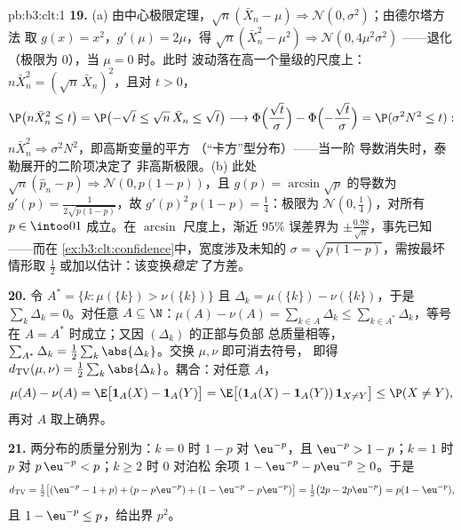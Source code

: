 \begin{solution}{pb:b3:clt:1}
\textbf{19.} (a) 由中心极限定理，$\sqrt n(\bar X_n - \mu)
\Rightarrow \mathcal N(0, \sigma^2)$；由德尔塔方法
取 $g(x) = x^2$，$g'(\mu) = 2\mu$，得 $\sqrt n(\bar
X_n^2 - \mu^2) \Rightarrow \mathcal N(0, 4\mu^2\sigma^2)$
——退化（极限为 $0$），当 $\mu = 0$ 时。此时
波动落在高一个量级的尺度上：$n\bar X_n^2 =
(\sqrt n\,\bar X_n)^2$，且对 $t > 0$，
\[
\P\bigl(n\bar X_n^2 \leq t\bigr) = \P\bigl(-\sqrt t \leq
\sqrt n\,\bar X_n \leq \sqrt t\bigr) \longrightarrow
\Phi\Bigl(\frac{\sqrt t}\sigma\Bigr) -
\Phi\Bigl(-\frac{\sqrt t}\sigma\Bigr) = \P(\sigma^2N^2
\leq t) :
\]
$n\bar X_n^2 \Rightarrow \sigma^2N^2$，即高斯变量的平方
（“卡方”型分布）——当一阶
导数消失时，泰勒展开的二阶项决定了
非高斯极限。(b) 此处 $\sqrt n(\hat p_n - p)
\Rightarrow \mathcal N(0, p(1 - p))$，且 $g(p) =
\arcsin\sqrt p$ 的导数为 $g'(p) = \frac1{2\sqrt{p(1 - p)}}$，故
$g'(p)^2\,p(1 - p) = \frac14$：极限为 $\mathcal
N(0, \frac14)$，对所有 $p \in \intoo01$ 成立。在
$\arcsin$ 尺度上，渐近 $95\%$ 误差界为 $\pm
\frac{0.98}{\sqrt n}$，事先已知——而在
\cref{ex:b3:clt:confidence}中，宽度涉及未知的
$\sigma = \sqrt{p(1-p)}$，需按最坏情形取 $\frac12$
或加以估计：该变换\emph{稳定}
了方差。

\textbf{20.} 令 $A^* = \{k : \mu(\{k\}) > \nu(\{k\})\}$
且 $\Delta_k = \mu(\{k\}) - \nu(\{k\})$，于是
$\sum_k\Delta_k = 0$。对任意 $A \subseteq \N$：$\mu(A) -
\nu(A) = \sum_{k\in A}\Delta_k \leq \sum_{k\in
A^*}\Delta_k$，等号在 $A = A^*$ 时成立；又因
$(\Delta_k)$ 的正部与负部
总质量相等，$\sum_{A^*}\Delta_k =
\frac12\sum_k\abs{\Delta_k}$。交换 $\mu, \nu$ 即可消去符号，
即得 $d_{\mathrm{TV}}(\mu, \nu) =
\frac12\sum_k\abs{\Delta_k}$。耦合：对任意 $A$，
\[
\mu(A) - \nu(A) = \E\bigl[\mathbf 1_A(X) - \mathbf
1_A(Y)\bigr] = \E\bigl[(\mathbf 1_A(X) - \mathbf
1_A(Y))\,\mathbf 1_{X\neq Y}\bigr] \leq \P(X \neq Y),
\]
再对 $A$ 取上确界。

\textbf{21.} 两分布的质量分别为：$k = 0$ 时 $1 - p$ 对
$\eu^{-p}$，且 $\eu^{-p} > 1 - p$；$k = 1$ 时 $p$ 对
$p\,\eu^{-p} < p$；$k \geq 2$ 时 $0$ 对泊松
余项 $1 - \eu^{-p} - p\eu^{-p} \geq 0$。于是
\[
d_{\mathrm{TV}} = \tfrac12\bigl[(\eu^{-p} - 1 + p) + (p -
p\eu^{-p}) + (1 - \eu^{-p} - p\eu^{-p})\bigr] =
\tfrac12\bigl(2p - 2p\eu^{-p}\bigr) = p(1 - \eu^{-p}),
\]
且 $1 - \eu^{-p} \leq p$，给出界 $p^2$。


\end{solution}
